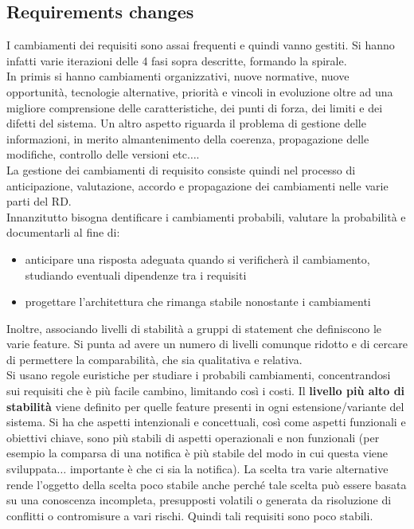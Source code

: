 \documentclass[a4paper,12pt, oneside]{book}
\begin{document}
\subsection{Requirements changes}
I cambiamenti dei requisiti sono assai frequenti e quindi vanno gestiti. Si
hanno infatti varie iterazioni delle 4 fasi sopra descritte, formando la
spirale.\\ 
In primis si hanno cambiamenti organizzativi, nuove normative, nuove
opportunità, tecnologie alternative, priorità e vincoli in evoluzione oltre ad
una migliore comprensione delle caratteristiche, dei punti di forza, dei limiti
e dei difetti del sistema. Un altro aspetto riguarda il problema di gestione
delle informazioni, in merito almantenimento della coerenza, propagazione delle
modifiche, controllo delle versioni etc$\ldots$.\\
La gestione dei cambiamenti di requisito consiste quindi nel processo di
anticipazione, valutazione, accordo e propagazione dei cambiamenti nelle varie
parti del RD.  \\
Innanzitutto bisogna dentificare i cambiamenti probabili, valutare la
probabilità e documentarli al fine di:
\begin{itemize}
  \item anticipare una risposta adeguata quando si verificherà il cambiamento,
  studiando eventuali dipendenze tra i requisiti
  \item progettare l'architettura che rimanga stabile nonostante i cambiamenti
\end{itemize}
Inoltre, associando livelli di stabilità a gruppi di statement che definiscono
le varie feature. Si punta ad avere un numero di livelli comunque ridotto e di
cercare di permettere la comparabilità, che sia qualitativa e relativa.\\
Si usano regole euristiche per studiare i probabili cambiamenti, concentrandosi
sui requisiti che è più facile cambino, limitando così i costi. Il
\textbf{livello più alto di stabilità} viene definito per quelle feature
presenti in ogni estensione/variante del sistema. Si ha che aspetti intenzionali
e concettuali, così come aspetti funzionali e obiettivi chiave, sono più stabili
di aspetti operazionali e non funzionali (per esempio la comparsa di una
notifica è più stabile del modo in cui questa viene sviluppata$\ldots$
importante è che ci sia la notifica). La scelta tra varie alternative rende 
l'oggetto della scelta poco stabile anche perché tale scelta può essere basata
su una conoscenza incompleta, presupposti volatili o generata da risoluzione di
conflitti o contromisure a vari rischi. Quindi tali requisiti sono poco
stabili.\\
\end{document}
